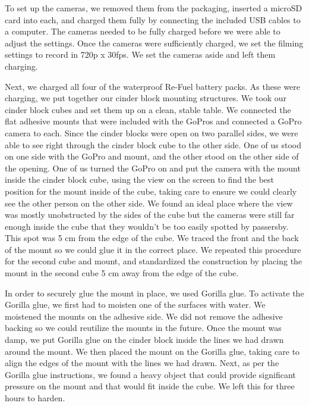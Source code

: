 \documentclass{article}\usepackage[]{graphicx}\usepackage[]{color}
\begin{document}
To set up the cameras, we removed them from the packaging, inserted a microSD card into each, and charged them fully by connecting the included USB cables to a computer. The cameras needed to be fully charged before we were able to adjust the settings. Once the cameras were sufficiently charged, we set the filming settings to record in 720p x 30fps. We set the cameras aside and left them charging. 

Next, we charged all four of the waterproof Re-Fuel battery packs. As these were charging, we put together our cinder block mounting structures. We took our cinder block cubes and set them up on a clean, stable table. We connected the flat adhesive mounts that were included with the GoPros and connected a GoPro camera to each. Since the cinder blocks were open on two parallel sides, we were able to see right through the cinder block cube to the other side. One of us stood on one side with the GoPro and mount, and the other stood on the other side of the opening. One of us turned the GoPro on and put the camera with the mount inside the cinder block cube, using the view on the screen to find the best position for the mount inside of the cube, taking care to ensure we could clearly see the other person on the other side. We found an ideal place where the view was mostly unobstructed by the sides of the cube but the cameras were still far enough inside the cube that they wouldn't be too easily spotted by passersby. This spot was 5 cm from the edge of the cube. We traced the front and the back of the mount so we could glue it in the correct place. We repeated this procedure for the second cube and mount, and standardized the construction by placing the mount in the second cube 5 cm away from the edge of the cube. 

In order to securely glue the mount in place, we used Gorilla glue. To activate the Gorilla glue, we first had to moisten one of the surfaces with water. We moistened the mounts on the adhesive side. We did not remove the adhesive backing so we could reutilize the mounts in the future. Once the mount was damp, we put Gorilla glue on the cinder block inside the lines we had drawn around the mount. We then placed the mount on the Gorilla glue, taking care to align the edges of the mount with the lines we had drawn. Next, as per the Gorilla glue instructions, we found a heavy object that could provide significant pressure on the mount and that would fit inside the cube. We left this for three hours to harden.
\end{document}
